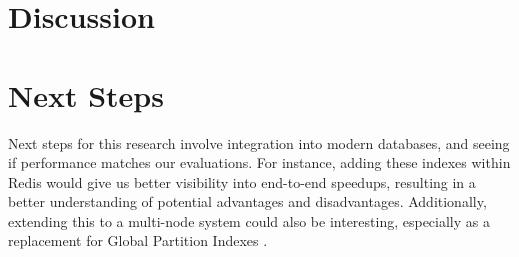 \documentclass[sigconf]{acmart}
\begin{document}
\section{Discussion}


\section{Next Steps}
Next steps for this research involve integration into modern databases, and seeing if performance matches our evaluations. For instance, adding these indexes within Redis would give us better visibility into end-to-end speedups, resulting in a better understanding of potential advantages and disadvantages. Additionally, extending this to a multi-node system could also be interesting, especially as a replacement for Global Partition Indexes \cite{}. 

\clearpage



\end{document}
